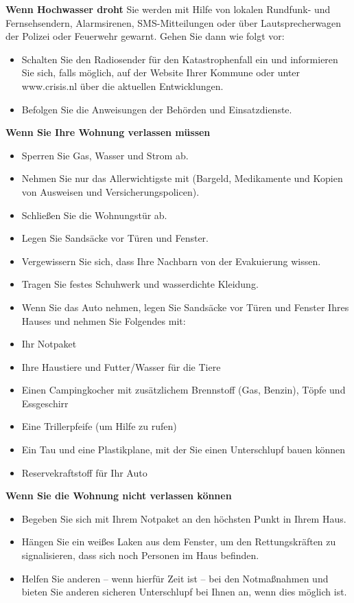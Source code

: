 \textnormal{\newline\bfseries Wenn Hochwasser droht}
\newline
\textnormal{Sie werden mit Hilfe von lokalen Rundfunk- und Fernsehsendern, 
Alarmsirenen, SMS-Mitteilungen oder über Lautsprecherwagen der Polizei
 oder Feuerwehr gewarnt. Gehen Sie dann wie folgt vor:}
\begin{itemize}  
\item Schalten Sie den Radiosender für den Katastrophenfall ein und informieren Sie sich, falls möglich, 
auf der Website Ihrer Kommune oder unter www.crisis.nl über die aktuellen Entwicklungen.
\item Befolgen Sie die Anweisungen der Behörden und Einsatzdienste.
\end{itemize}  
\textnormal{\newline\bfseries Wenn Sie Ihre Wohnung verlassen müssen}
\begin{itemize}  
 \item   Sperren Sie Gas, Wasser und Strom ab.
\item    Nehmen Sie nur das Allerwichtigste mit (Bargeld, Medikamente und Kopien von Ausweisen und Versicherungspolicen).
\item    Schließen Sie die Wohnungstür ab.
 \item   Legen Sie Sandsäcke vor Türen und Fenster.
 \item   Vergewissern Sie sich, dass Ihre Nachbarn von der Evakuierung wissen.
\item    Tragen Sie festes Schuhwerk und wasserdichte Kleidung.
\item    Wenn Sie das Auto nehmen, legen Sie Sandsäcke vor Türen und Fenster Ihres Hauses und nehmen Sie Folgendes mit:
\item    Ihr Notpaket
\item    Ihre Haustiere und Futter/Wasser für die Tiere
\item    Einen Campingkocher mit zusätzlichem Brennstoff (Gas, Benzin), Töpfe und Essgeschirr
 \item   Eine Trillerpfeife (um Hilfe zu rufen)
 \item   Ein Tau und eine Plastikplane, mit der Sie einen Unterschlupf bauen können
 \item   Reservekraftstoff für Ihr Auto
\end{itemize}  
\textnormal{\newline\bfseries Wenn Sie die Wohnung nicht verlassen können}
\begin{itemize}  
   \item Begeben Sie sich mit Ihrem Notpaket an den höchsten Punkt in Ihrem Haus.
   \item Hängen Sie ein weißes Laken aus dem Fenster, um den Rettungskräften zu signalisieren, dass sich noch Personen im Haus befinden.
  \item  Helfen Sie anderen – wenn hierfür Zeit ist – bei den Notmaßnahmen und bieten Sie anderen sicheren Unterschlupf bei Ihnen an, wenn dies möglich ist.
\end{itemize}  

